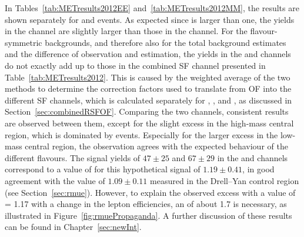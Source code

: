 
In Tables~\ref{tab:METresults2012EE} and~\ref{tab:METresults2012MM}, the results are shown separately for \EE and \MM events. As expected since \rmue is larger than one, the yields in the \MM channel are slightly larger than those in the \EE channel. For the flavour-symmetric backgrounds, and therefore also for the total background estimates and the difference of observation and estimation, the yields in the \EE and \MM channels do not exactly add up to those in the combined SF channel presented in Table~\ref{tab:METresults2012}. This is caused by the weighted average of the two methods to determine the correction factors used to translate from OF into the different SF channels, which is calculated separately for \Rsfof, \Reeof, and \Rmmof, as discussed in Section~\ref{sec:combinedRSFOF}. Comparing the two channels, consistent results are observed between them, except for the slight excess in the high-mass central region, which is dominated by \EE events. Especially for the larger excess in the low-mass central region, the observation agrees with the expected behaviour of the different flavours. The signal yields of $47\pm25$ and $67\pm29$ in the \EE and \MM channels correspond to a value of \rmue for this hypothetical signal of $1.19\pm0.41$, in good agreement with the value of $1.09\pm0.11$ measured in the Drell--Yan control region (see Section~\ref{sec:rmue}). However, to explain the observed excess with a value of \Rsfof = 1.17 with a change in the lepton efficiencies, an \rmue of about 1.7 is necessary, as illustrated in Figure~\ref{fig:rmuePropaganda}. A further discussion of these results can be found in Chapter~\ref{sec:newInt}.




